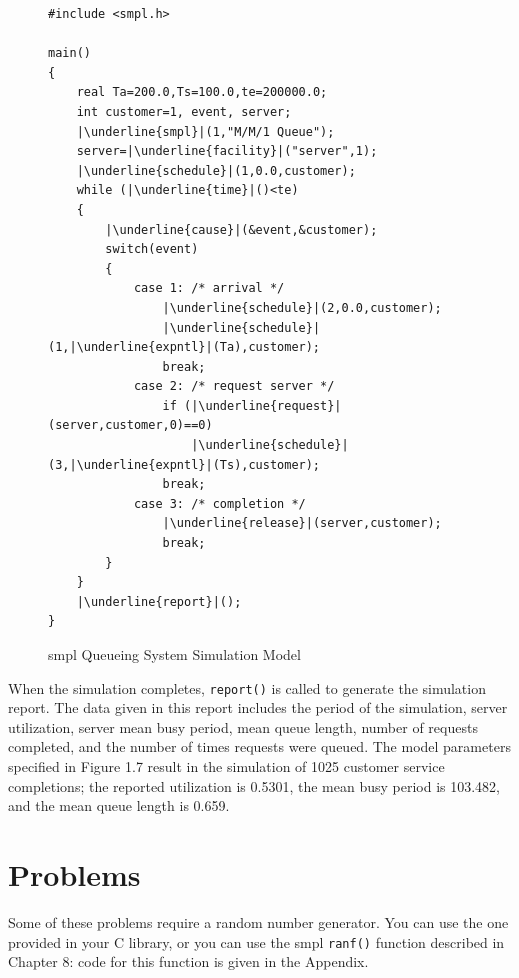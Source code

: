 \begin{figure}[H]
\centering
\begin{minipage}{.96\textwidth}
\begin{lstlisting}[basicstyle=\ttfamily\normalsize,language={},escapechar=|]
#include <smpl.h>

main()
{
    real Ta=200.0,Ts=100.0,te=200000.0;
    int customer=1, event, server;
    |\underline{smpl}|(1,"M/M/1 Queue");
    server=|\underline{facility}|("server",1);
    |\underline{schedule}|(1,0.0,customer);
    while (|\underline{time}|()<te)
    {
        |\underline{cause}|(&event,&customer);
        switch(event)
        {
            case 1: /* arrival */
                |\underline{schedule}|(2,0.0,customer);
                |\underline{schedule}|(1,|\underline{expntl}|(Ta),customer);
                break;
            case 2: /* request server */
                if (|\underline{request}|(server,customer,0)==0)
                    |\underline{schedule}|(3,|\underline{expntl}|(Ts),customer);
                break;
            case 3: /* completion */
                |\underline{release}|(server,customer);
                break;
        }
    }
    |\underline{report}|();
}
\end{lstlisting}
\end{minipage}
\caption{smpl Queueing System Simulation Model}
\end{figure}
When the simulation completes, \texttt{report()} is called to generate the
simulation report. The data given in this report includes the period of the
simulation, server utilization, server mean busy period, mean queue length,
number of requests completed, and the number of times requests were queued. The
model parameters specified in Figure 1.7 result in the simulation of 1025
customer service completions; the reported utilization is 0.5301, the mean busy
period is 103.482, and the mean queue length is 0.659.

\section{Problems}
\label{sec:intro-problems}
Some of these problems require a random number generator. You can use the one
provided in your C library, or you can use the smpl \texttt{ranf()} function
described in Chapter 8: code for this function is given in the Appendix.

